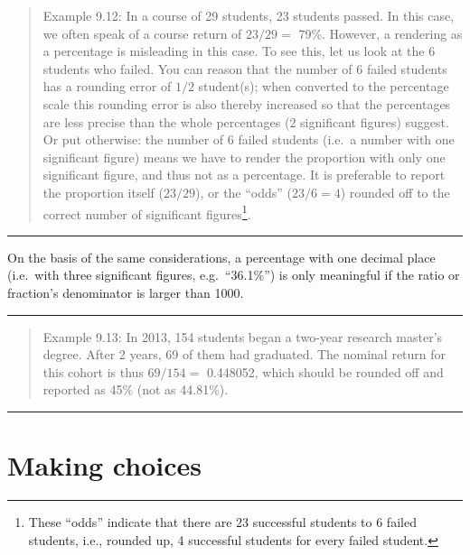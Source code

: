 \documentclass[
]{book}
\begin{document}
\begin{quote}
Example 9.12:
In a course of 29 students, 23 students passed. In this case, we often
speak of a course return of \(23/29=\) 79\%. However, a rendering as a
percentage is misleading in this case. To see this, let us look
at the 6 students who failed. You can reason that the number of 6 failed
students has a rounding error of \(1/2\) student(s); when converted to the
percentage scale this rounding error is also thereby increased so that
the percentages are less precise than the whole percentages (2
significant figures) suggest. Or put otherwise: the number of 6
failed students (i.e.~a number with one significant figure) means we have
to render the proportion with only one significant figure, and thus not
as a percentage. It is preferable to report the proportion itself (\(23/29\)), or
the ``odds'' (\(23/6=4\)) rounded off to the correct number of significant
figures\footnote{These ``odds'' indicate that there are 23 successful students to 6 failed students, i.e., rounded up, 4 successful students for every failed student.}.
\end{quote}

\begin{center}\rule{0.5\linewidth}{0.5pt}\end{center}

On the basis of the same considerations, a percentage with one decimal
place (i.e.~with three significant figures, e.g.~``36.1\%'') is only
meaningful if the ratio or fraction's denominator is larger than 1000.

\begin{center}\rule{0.5\linewidth}{0.5pt}\end{center}

\begin{quote}
Example 9.13:
In 2013, 154 students began a two-year research master's degree. After
2 years, 69 of them had graduated. The nominal return for this cohort is
thus \(69/154=\) 0.448052, which should be rounded off and reported as 45\%
(not as 44.81\%).
\end{quote}

\begin{center}\rule{0.5\linewidth}{0.5pt}\end{center}

\section{Making choices}\label{sec:robustefficient}
\end{document}
